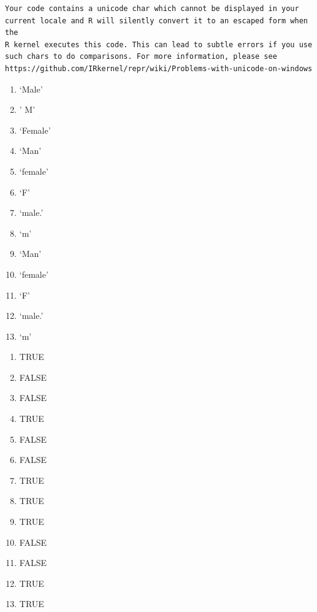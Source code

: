 \documentclass[
  letterpaper,
  DIV=11,
  numbers=noendperiod]{scrreprt}
\newenvironment{Shaded}{\begin{snugshade}}{\end{snugshade}}
\newcommand{\AttributeTok}[1]{\textcolor[rgb]{0.40,0.45,0.13}{#1}}
\newcommand{\CommentTok}[1]{\textcolor[rgb]{0.37,0.37,0.37}{#1}}
\newcommand{\ConstantTok}[1]{\textcolor[rgb]{0.56,0.35,0.01}{#1}}
\newcommand{\FunctionTok}[1]{\textcolor[rgb]{0.28,0.35,0.67}{#1}}
\newcommand{\NormalTok}[1]{\textcolor[rgb]{0.00,0.23,0.31}{#1}}
\newcommand{\SpecialCharTok}[1]{\textcolor[rgb]{0.37,0.37,0.37}{#1}}
\newcommand{\StringTok}[1]{\textcolor[rgb]{0.13,0.47,0.30}{#1}}
\providecommand{\tightlist}{%
  \setlength{\itemsep}{0pt}\setlength{\parskip}{0pt}}\usepackage{longtable,booktabs,array}
\begin{document}
\begin{Shaded}
\end{Shaded}

\begin{verbatim}
Your code contains a unicode char which cannot be displayed in your
current locale and R will silently convert it to an escaped form when the
R kernel executes this code. This can lead to subtle errors if you use
such chars to do comparisons. For more information, please see
https://github.com/IRkernel/repr/wiki/Problems-with-unicode-on-windows
\end{verbatim}

\begin{enumerate}
\def\labelenumi{\arabic{enumi}.}
\tightlist
\item
  `Male'
\item
  {' M'}
\item
  `Female'
\item
  `Man'
\item
  `female'
\item
  {`F'}
\item
  `male.'
\item
  `m'
\item
  `Man'
\item
  `female'
\item
  {`F'}
\item
  `male.'
\item
  `m'
\end{enumerate}

\begin{enumerate}
\def\labelenumi{\arabic{enumi}.}
\tightlist
\item
  TRUE
\item
  FALSE
\item
  FALSE
\item
  TRUE
\item
  FALSE
\item
  FALSE
\item
  TRUE
\item
  TRUE
\item
  TRUE
\item
  FALSE
\item
  FALSE
\item
  TRUE
\item
  TRUE
\end{enumerate}
\end{document}
